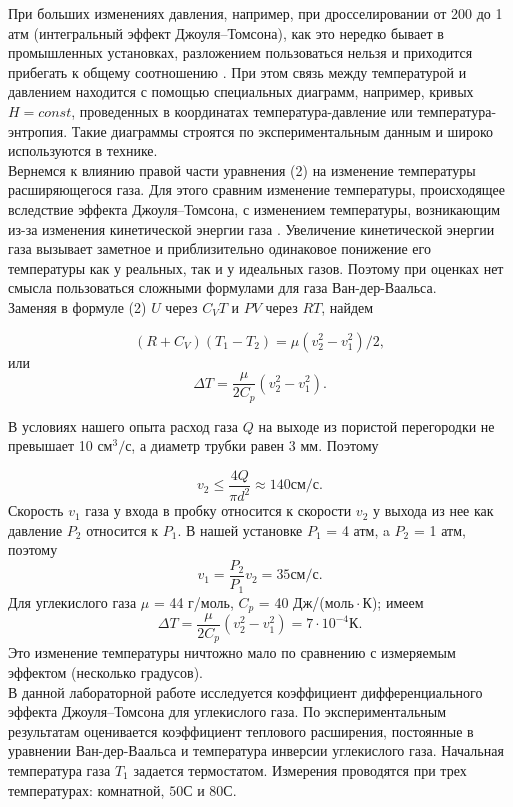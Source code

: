 \documentclass[a4paper, 12pt]{article}%
\begin{document}
	При больших изменениях давления, например, при дросселировании от 200 до 1 атм (интегральный эффект Джоуля–Томсона), как это нередко бывает в промышленных установках, разложением  пользоваться нельзя и приходится прибегать к общему соотношению . При этом связь между температурой и давлением находится с помощью специальных диаграмм, например, кривых $H = const$, проведенных в координатах температура-давление или температура-энтропия. Такие диаграммы строятся по экспериментальным данным и широко используются в технике.\\
	
	Вернемся к влиянию правой части уравнения (2) на изменение температуры расширяющегося газа. Для этого сравним изменение температуры, происходящее вследствие эффекта Джоуля–Томсона, с
	изменением температуры, возникающим из-за изменения кинетической энергии газа . Увеличение кинетической энергии газа вызывает заметное и приблизительно одинаковое понижение его температуры как у реальных, так и у идеальных газов. Поэтому при оценках нет смысла пользоваться сложными формулами для газа Ван-дер-Ваальса.\\
	
	Заменяя в формуле (2) $U$ через $C_V T$ и $P V$ через $RT$, найдем
	
	\begin{equation}
		(R+C_V)(T_1 - T_2) = \mu(v_2^2 - v_1^2)/2,
	\end{equation}
	или
	\begin{equation}
		\Delta T = \dfrac{\mu}{2C_p} (v_2^2 - v_1^2).
	\end{equation}
	
	В условиях нашего опыта расход газа $Q$ на выходе из пористой перегородки не превышает 10 $см^3/с$, а диаметр трубки равен 3 мм. Поэтому
	
	\begin{equation}
		v_2 \leqslant \dfrac{4Q}{\pi d^2} \approx 140 см/с.
	\end{equation}
	Скорость $v_1$ газа у входа в пробку относится к скорости $v_2$ у выхода из нее как давление $P_2$ относится к $P_1$. В нашей установке $P_1$ = 4 атм, a $P_2$ = 1 атм, поэтому
	\begin{equation}
		v_1 = \dfrac{P_2}{P_1} v_2 = 35 см/с.
	\end{equation}
	Для углекислого газа $\mu$ = 44 г/моль, $C_p$ = 40 Дж/($моль \cdot К$); имеем
	\begin{equation}
		\Delta T = \dfrac{\mu}{2C_p} (v_2^2 - v_1^2) = 7 \cdot 10^{-4} К.
	\end{equation}
	Это изменение температуры ничтожно мало по сравнению с измеряемым эффектом (несколько градусов).\\
	В данной лабораторной работе исследуется коэффициент дифференциального эффекта Джоуля–Томсона для углекислого газа. По экспериментальным результатам оценивается коэффициент теплового расширения, постоянные в уравнении Ван-дер-Ваальса и температура инверсии углекислого газа. Начальная температура газа $T_1$ задается термостатом. Измерения проводятся при трех температурах: комнатной, $50 С$ и $80 С$.\\
	
\end{document}
